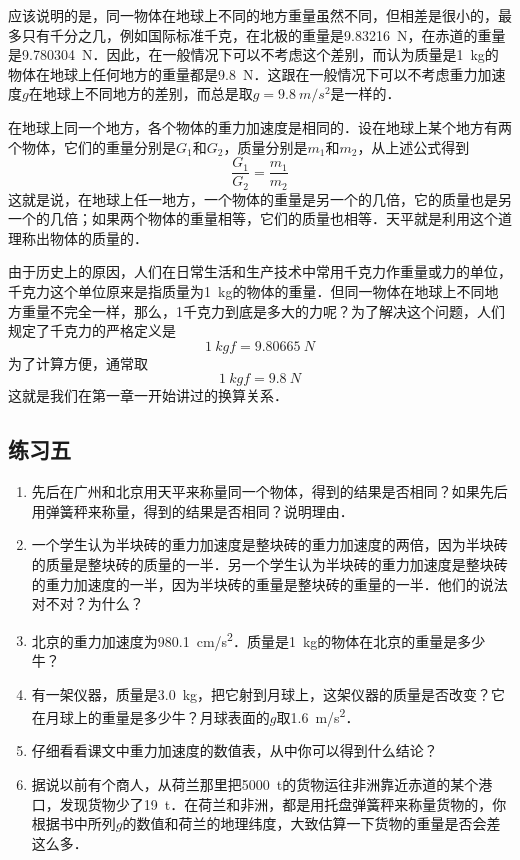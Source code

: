 应该说明的是，同一物体在地球上不同的地方重量虽然不同，但相差是很小的，最多只有千分之几，例如国际标准千克，在北极的重量是\SI{9.83216}{N}，在赤道的重量是\SI{9.780304}{N}．因此，在一般情况下可以不考虑这个差别，而认为质量是\SI{1}{kg}的物体在地球上任何地方的重量都是\SI{9.8}{N}．这跟在一般情况下可以不考虑重力加速度$g$在地球上不同地方的差别，而总是取$g=\SI{9.8}{m/s^2}$是一样的．

在地球上同一个地方，各个物体的重力加速度是相同的．设在地球上某个地方有两个物体，它们的重量分别是$G_1$和$G_2$，质量分别是$m_1$和$m_2$，从上述公式得到
\[\frac{G_1}{G_2}=\frac{m_1}{m_2} \]
这就是说，在地球上任一地方，一个物体的重量是另一个的几倍，它的质量也是另一个的几倍；如果两个物体的重量相等，它们的质量也相等．天平就是利用这个道理称出物体的质量的．

由于历史上的原因，人们在日常生活和生产技术中常用千克力作重量或力的单位，千克力这个单位原来是指质量为\SI{1}{kg}的物体的重量．但同一物体在地球上不同地方重量不完全一样，那么，1千克力到底是多大的力呢？为了解决这个问题，人们规定了千克力的严格定义是
\[\SI{1}{kgf}=\SI{9.80665}{N}\]
为了计算方便，通常取
\[\SI{1}{kgf}=\SI{9.8}{N}\]
这就是我们在第一章一开始讲过的换算关系．

\subsection*{练习五}
\begin{enumerate}
    \item 先后在广州和北京用天平来称量同一个物体，得到的结果是否相同？如果先后用弹簧秤来称量，得到的结果是否相同？说明理由．
    \item 一个学生认为半块砖的重力加速度是整块砖的重力加速度的两倍，因为半块砖的质量是整块砖的质量的一半．另一个学生认为半块砖的重力加速度是整块砖的重力加速度的一半，因为半块砖的重量是整块砖的重量的一半．他们的说法对不对？为什么？
    \item 北京的重力加速度为\SI{980.1}{cm/s^2}．质量是\SI{1}{kg}的物体在北京的重量是多少牛？
    \item 有一架仪器，质量是\SI{3.0}{kg}，把它射到月球上，这架仪器的质量是否改变？它在月球上的重量是多少牛？月球表面的$g$取\SI{1.6}{m/s^2}．
    \item 仔细看看课文中重力加速度的数值表，从中你可以得到什么结论？
    \item 据说以前有个商人，从荷兰那里把\SI{5000}{t}的货物运往非洲靠近赤道的某个港口，发现货物少了\SI{19}{t}．在荷兰和非洲，都是用托盘弹簧秤来称量货物的，你根据书中所列$g$的数值和荷兰的地理纬度，大致估算一下货物的重量是否会差这么多．
\end{enumerate}
\newpage
